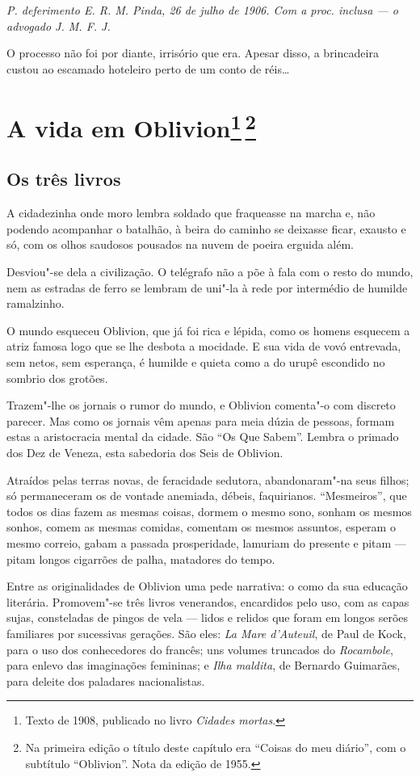 \emph{P. deferimento E. R. M. Pinda, 26 de julho de 1906. Com a proc.
inclusa --- o advogado J. M. F. J.}

O processo não foi por diante, irrisório que era. Apesar disso, a
brincadeira custou ao escamado hoteleiro perto de um conto de réis\ldots{}

\chapter{A vida em Oblivion\footnote[*]{Texto de 1908, publicado no livro \emph{Cidades mortas}.}\,\footnote[**]{Na primeira edição o
  título deste capítulo era ``Coisas do meu diário'', com o subtítulo
  ``Oblivion''. Nota da edição de 1955.}}

\section*{Os três livros}

A cidadezinha onde moro lembra soldado que fraqueasse na marcha e, não
podendo acompanhar o batalhão, à beira do caminho se deixasse ficar,
exausto e só, com os olhos saudosos pousados na nuvem de poeira erguida
além.

Desviou"-se dela a civilização. O telégrafo não a põe à fala com o resto
do mundo, nem as estradas de ferro se lembram de uni"-la à rede por
intermédio de humilde ramalzinho.

O mundo esqueceu Oblivion, que já foi rica e lépida, como os homens
esquecem a atriz famosa logo que se lhe desbota a mocidade. E sua vida
de vovó entrevada, sem netos, sem esperança, é humilde e quieta como a
do urupê escondido no sombrio dos grotões.

Trazem"-lhe os jornais o rumor do mundo, e Oblivion comenta"-o com
discreto parecer. Mas como os jornais vêm apenas para meia dúzia de
pessoas, formam estas a aristocracia mental da cidade. São ``Os Que
Sabem''. Lembra o primado dos Dez de Veneza, esta sabedoria dos Seis de
Oblivion.

Atraídos pelas terras novas, de feracidade sedutora, abandonaram"-na seus
filhos; só permaneceram os de vontade anemiada, débeis, faquirianos.
``Mesmeiros'', que todos os dias fazem as mesmas coisas, dormem o mesmo
sono, sonham os mesmos sonhos, comem as mesmas comidas, comentam os
mesmos assuntos, esperam o mesmo correio, gabam a passada prosperidade,
lamuriam do presente e pitam --- pitam longos cigarrões de palha,
matadores do tempo.

Entre as originalidades de Oblivion uma pede narrativa: o como da sua
educação literária. Promovem"-se três livros venerandos, encardidos pelo
uso, com as capas sujas, consteladas de pingos de vela --- lidos e
relidos que foram em longos serões familiares por sucessivas gerações.
São eles: \emph{La Mare d'Auteuil}, de Paul de Kock, para o uso dos
conhecedores do francês; uns volumes truncados do \emph{Rocambole}, para
enlevo das imaginações femininas; e \emph{Ilha maldita}, de Bernardo
Guimarães, para deleite dos paladares nacionalistas.

